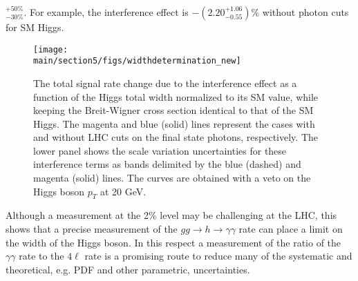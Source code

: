 $^{+50\%}_{-30\%}$. For example, the interference effect is $-(2.20^{+1.06}_{-0.55})\%$ without photon cuts for SM Higgs.
%
\begin{figure}[htbp]
\begin{center}
\texttt{[image: \\main/section5/figs/widthdetermination\_new]}
\caption{
The total signal rate change due to the interference effect as a function of the Higgs total width normalized to its SM value, while keeping
the Breit-Wigner cross section identical to that of the SM Higgs. The magenta and blue (solid) lines represent the cases with and without LHC cuts
on the final state photons, respectively. The lower panel shows the scale variation uncertainties for these interference terms  as bands delimited by the blue (dashed)
 and magenta (solid) lines. The curves are obtained with a veto on the Higgs boson $p_T$  at 20 GeV. 
}
\label{fig:width}
\end{center}

\end{figure}
%
Although a measurement at the 2\% level may be challenging at the LHC, 
this shows that a precise measurement of the $gg\to h \to \gamma\gamma$ rate can place a limit on the width of the Higgs boson. 
In this respect a measurement of the ratio of the $\gamma\gamma$ rate to the $4\ell$ rate is a promising route to reduce many of the systematic and theoretical, e.g. PDF and other parametric, uncertainties.

